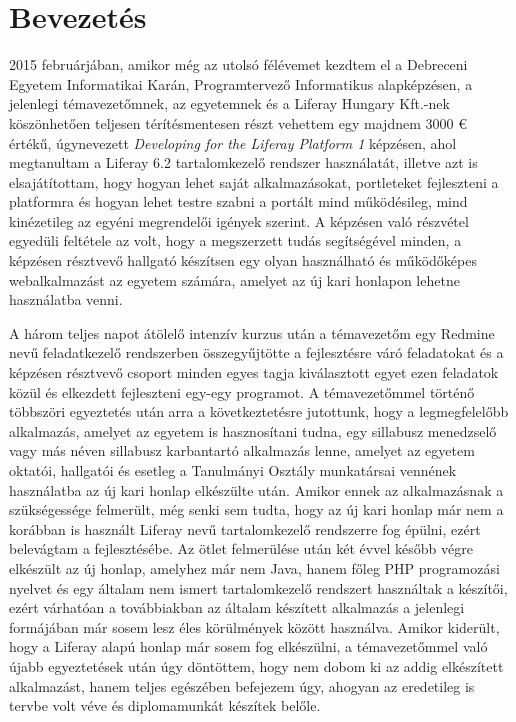 \documentclass[hidelinks, 12pt, a4paper]{report}
\begin{document}
\clearpage
\setcounter{page}{2}

\tableofcontents

\chapter{Bevezetés}

2015 februárjában, amikor még az utolsó félévemet kezdtem el a Debreceni Egyetem Informatikai Karán, Programtervező Informatikus alapképzésen, a jelenlegi témavezetőmnek, az egyetemnek és a Liferay Hungary Kft.-nek köszönhetően teljesen térítésmentesen részt vehettem egy majdnem 3000 € értékű, \cite{liferay-dev-1} úgynevezett \emph{Developing for the Liferay Platform 1} képzésen, ahol megtanultam a Liferay 6.2 tartalomkezelő rendszer \cite{liferay} használatát, illetve azt is elsajátítottam, hogy hogyan lehet saját alkalmazásokat, portleteket fejleszteni a platformra és hogyan lehet testre szabni a portált mind működésileg, mind kinézetileg az egyéni megrendelői igények szerint. A képzésen való részvétel egyedüli feltétele az volt, hogy a megszerzett tudás segítségével minden, a képzésen résztvevő hallgató készítsen egy olyan használható és működőképes webalkalmazást az egyetem számára, amelyet az új kari honlapon lehetne használatba venni.

A három teljes napot átölelő intenzív kurzus után a témavezetőm egy Redmine \cite{redmine} nevű feladatkezelő rendszerben összegyűjtötte a fejlesztésre váró feladatokat és a képzésen résztvevő csoport minden egyes tagja kiválasztott egyet ezen feladatok közül és elkezdett fejleszteni egy-egy programot. A témavezetőmmel történő többszöri egyeztetés után arra a következtetésre jutottunk, hogy a legmegfelelőbb alkalmazás, amelyet az egyetem is hasznosítani tudna, egy sillabusz menedzselő vagy más néven sillabusz karbantartó alkalmazás lenne, amelyet az egyetem oktatói, hallgatói és esetleg a Tanulmányi Osztály munkatársai vennének használatba az új kari honlap elkészülte után. Amikor ennek az alkalmazásnak a szükségessége felmerült, még senki sem tudta, hogy az új kari honlap már nem a korábban is használt Liferay nevű tartalomkezelő rendszerre fog épülni, ezért belevágtam a fejlesztésébe. Az ötlet felmerülése után két évvel később végre elkészült az új honlap, amelyhez már nem Java, hanem főleg PHP programozási nyelvet és egy általam nem ismert tartalomkezelő rendszert használtak a készítői, ezért várhatóan a továbbiakban az általam készített alkalmazás a jelenlegi formájában már sosem lesz éles körülmények között használva. Amikor kiderült, hogy a Liferay alapú honlap már sosem fog elkészülni, a témavezetőmmel való újabb egyeztetések után úgy döntöttem, hogy nem dobom ki az addig elkészített alkalmazást, hanem teljes egészében befejezem úgy, ahogyan az eredetileg is tervbe volt véve és diplomamunkát készítek belőle.
\end{document}
